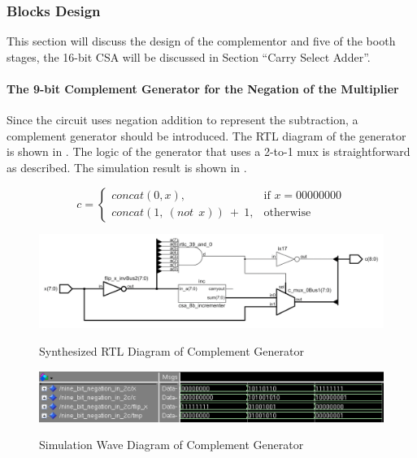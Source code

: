 \subsubsection{Blocks Design}

This section will discuss the design of the complementor and five of the booth stages,
the 16-bit CSA will be discussed in Section “Carry Select Adder”.

\paragraph{The 9-bit Complement Generator for the Negation of the Multiplier}
Since the circuit uses negation addition to represent the subtraction, a complement generator should be introduced.
The RTL diagram of the generator is shown in .
The logic of the generator that uses a 2-to-1 mux is straightforward as  described.
The simulation result is shown in .

\begin{equation}
	c =
	\begin{cases}
		concat(0, x),                 & \text{if } x = 00000000 \\
		concat(1,\ (not\ \ x))\ +\ 1, & \text{otherwise}
	\end{cases}
	\label{exp:complementor_exp}
\end{equation}

\begin{figure}[!ht]
	\centering
	\caption{Synthesized RTL Diagram of Complement Generator}
	\includegraphics[width=\textwidth]{../img/complementor_rtl.png}
	\label{fig:complementor_rtl}
\end{figure}

\begin{figure}[!ht]
	\centering
	\caption{Simulation Wave Diagram of Complement Generator}
	\includegraphics[width=\textwidth]{../img/complementor_sim.png}
	\label{fig:complementor_sim}
\end{figure}

